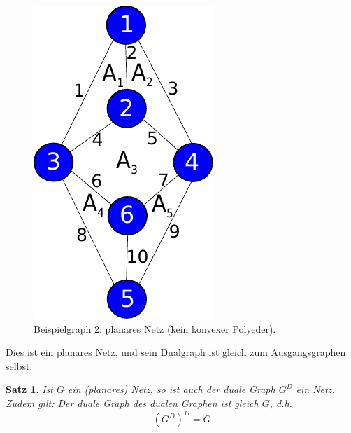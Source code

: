 \documentclass[11pt,a4paper,leqno]{report}
\newtheorem{proposition}{Satz}[chapter]
\numberwithin{equation}{chapter}
\begin{document}
\begin{figure}[H]
	\begin{center}
		\includegraphics[scale=0.4]{Abbildungen/graph_2_planar_flach.pdf}
		\caption{Beispielgraph 2: planares Netz (kein konvexer Polyeder).}
	\end{center}
\end{figure}
\noindent
Dies ist ein planares Netz, und sein Dualgraph ist gleich zum Ausgangsgraphen selbst.
\begin{proposition}
Ist $G$ ein (planares) Netz, so ist auch der duale Graph $G^D$ ein Netz.
Zudem gilt: Der duale Graph des dualen Graphen ist gleich $G$, d.h.
$$
(G^D)^D = G
$$
\end{proposition}
\end{document}
